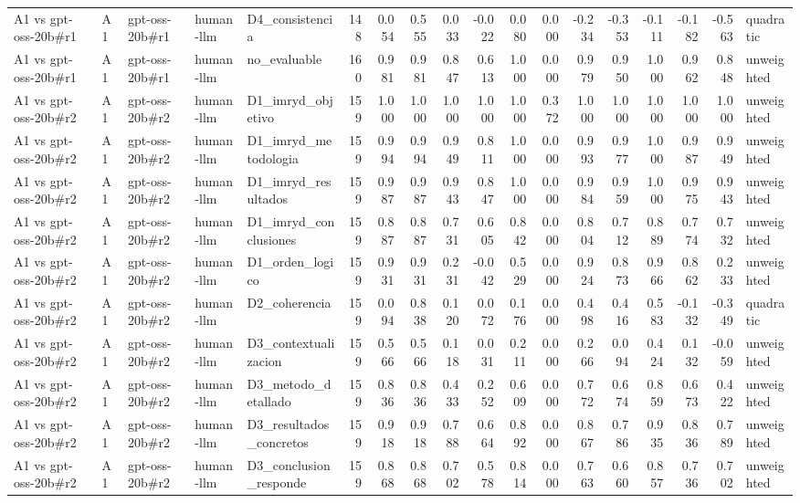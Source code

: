 \begin{table}
{\begin{tabular}{lllllrrrrrrrrrrrrl}
A1 vs gpt-oss-20b\#r1 & A1 & gpt-oss-20b\#r1 & human-llm & D4\_consistencia & 148 & 0.054 & 0.555 & 0.033 & -0.022 & 0.080 & 0.000 & -0.234 & -0.353 & -0.111 & -0.182 & -0.563 & quadratic \\
A1 vs gpt-oss-20b\#r1 & A1 & gpt-oss-20b\#r1 & human-llm & no\_evaluable & 160 & 0.981 & 0.981 & 0.847 & 0.613 & 1.000 & 0.000 & 0.979 & 0.950 & 1.000 & 0.962 & 0.848 & unweighted \\
A1 vs gpt-oss-20b\#r2 & A1 & gpt-oss-20b\#r2 & human-llm & D1\_imryd\_objetivo & 159 & 1.000 & 1.000 & 1.000 & 1.000 & 1.000 & 0.372 & 1.000 & 1.000 & 1.000 & 1.000 & 1.000 & unweighted \\
A1 vs gpt-oss-20b\#r2 & A1 & gpt-oss-20b\#r2 & human-llm & D1\_imryd\_metodologia & 159 & 0.994 & 0.994 & 0.949 & 0.811 & 1.000 & 0.000 & 0.993 & 0.977 & 1.000 & 0.987 & 0.949 & unweighted \\
A1 vs gpt-oss-20b\#r2 & A1 & gpt-oss-20b\#r2 & human-llm & D1\_imryd\_resultados & 159 & 0.987 & 0.987 & 0.943 & 0.847 & 1.000 & 0.000 & 0.984 & 0.959 & 1.000 & 0.975 & 0.943 & unweighted \\
A1 vs gpt-oss-20b\#r2 & A1 & gpt-oss-20b\#r2 & human-llm & D1\_imryd\_conclusiones & 159 & 0.887 & 0.887 & 0.731 & 0.605 & 0.842 & 0.000 & 0.804 & 0.712 & 0.889 & 0.774 & 0.732 & unweighted \\
A1 vs gpt-oss-20b\#r2 & A1 & gpt-oss-20b\#r2 & human-llm & D1\_orden\_logico & 159 & 0.931 & 0.931 & 0.231 & -0.042 & 0.529 & 0.000 & 0.924 & 0.873 & 0.966 & 0.862 & 0.233 & unweighted \\
A1 vs gpt-oss-20b\#r2 & A1 & gpt-oss-20b\#r2 & human-llm & D2\_coherencia & 159 & 0.094 & 0.838 & 0.120 & 0.072 & 0.176 & 0.000 & 0.498 & 0.416 & 0.583 & -0.132 & -0.349 & quadratic \\
A1 vs gpt-oss-20b\#r2 & A1 & gpt-oss-20b\#r2 & human-llm & D3\_contextualizacion & 159 & 0.566 & 0.566 & 0.118 & 0.031 & 0.211 & 0.000 & 0.266 & 0.094 & 0.424 & 0.132 & -0.059 & unweighted \\
A1 vs gpt-oss-20b\#r2 & A1 & gpt-oss-20b\#r2 & human-llm & D3\_metodo\_detallado & 159 & 0.836 & 0.836 & 0.433 & 0.252 & 0.609 & 0.000 & 0.772 & 0.674 & 0.859 & 0.673 & 0.422 & unweighted \\
A1 vs gpt-oss-20b\#r2 & A1 & gpt-oss-20b\#r2 & human-llm & D3\_resultados\_concretos & 159 & 0.918 & 0.918 & 0.788 & 0.664 & 0.892 & 0.000 & 0.867 & 0.786 & 0.935 & 0.836 & 0.789 & unweighted \\
A1 vs gpt-oss-20b\#r2 & A1 & gpt-oss-20b\#r2 & human-llm & D3\_conclusion\_responde & 159 & 0.868 & 0.868 & 0.702 & 0.578 & 0.814 & 0.000 & 0.763 & 0.660 & 0.857 & 0.736 & 0.702 & unweighted \\

\end{tabular}}
\end{table}
